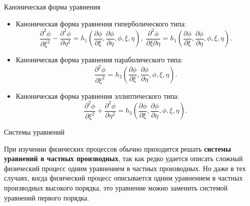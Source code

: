 \documentclass[10pt,xcolor=pst,aspectratio=169]{beamer}
\begin{document}
\begin{frame}{Каноническая форма уравнения}

    \transdissolve[duration=0.1]
    \justifying
    \large

    \begin{itemize}
        \item Каноническая форма уравнения гиперболического типа:
            \[
                \frac{\partial^{2} \phi}{\partial \xi^{2}} - \frac{\partial^{2} \phi}{\partial \eta^{2}} = h_{1} \left( \frac{\partial \phi}{\partial \xi}, \frac{\partial \phi}{\partial \eta}, \phi, \xi, \eta \right), \; \frac{\partial^{2} \phi}{\partial \xi \partial \eta} = h_{1} \left( \frac{\partial \phi}{\partial \xi}, \frac{\partial \phi}{\partial \eta}, \phi, \xi, \eta \right).
            \]

        \item Каноническая форма уравнения параболического типа:
            \[
                \frac{\partial^{2} \phi}{\partial \xi^{2}} = h_{2} \left( \frac{\partial \phi}{\partial \xi}, \frac{\partial \phi}{\partial \eta}, \phi, \xi, \eta \right).
            \]

        \item Каноническая форма уравнения эллиптического типа:
            \[
                \frac{\partial^{2} \phi}{\partial \xi^{2}} + \frac{\partial^{2} \phi}{\partial \eta^{2}} = h_{3} \left( \frac{\partial \phi}{\partial \xi}, \frac{\partial \phi}{\partial \eta}, \phi, \xi, \eta \right).
            \]
    \end{itemize}

\end{frame}

\begin{frame}{Системы уравнений}

    \transdissolve[duration=0.1]
    \justifying
    \large

    При изучении физических процессов обычно приходится решать \textbf{системы уравнений в частных производных}, так как редко удается описать сложный физический процесс одним уравнением в частных производных. Но даже в тех случаях, когда физический процесс описывается одним уравнением в частных производных высокого порядка, это уравнение можно заменить системой уравнений первого порядка.

\end{frame}
\end{document}
